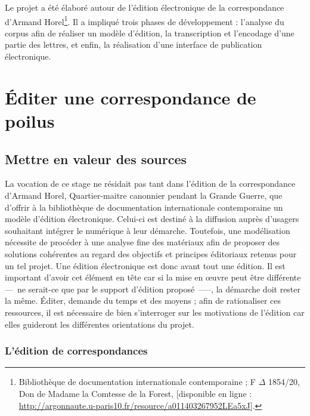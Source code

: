 \documentclass[12pt,a4paper]{book} %
\begin{document}
Le projet a été élaboré autour de l'édition électronique de la correspondance d'Armand Horel\footnote{Bibliothèque de documentation internationale contemporaine ; F $\Delta$ 1854/20, Don de Madame la Comtesse de la Forest, [disponible en ligne : \url{http://argonnaute.u-paris10.fr/resource/a011403267952LEa5xJ}].}. Il a impliqué trois phases de développement : l'analyse du corpus afin de réaliser un modèle d'édition, la transcription et l'encodage d'une partie des lettres, et enfin, la réalisation d'une interface de publication électronique.



\clearpage
\thispagestyle{empty}
\cleardoublepage
\nocite{*}
\printbibliography

\mainmatter


\part{Éditer une correspondance de poilus}


\chapter{Mettre en valeur des sources}
La vocation de ce stage ne résidait pas tant dans l'édition de la correspondance d'Armand Horel, Quartier-maitre canonnier pendant la Grande Guerre, que d'offrir à la bibliothèque de documentation internationale contemporaine un modèle d'édition électronique. Celui-ci est destiné à la diffusion auprès d'usagers souhaitant intégrer le numérique à leur démarche. 
Toutefois, une modélisation nécessite de procéder à une analyse fine des matériaux afin de proposer des solutions cohérentes au regard des objectifs et principes éditoriaux retenus pour un tel projet. Une édition électronique est donc avant tout une édition. Il est important d'avoir cet élément en tête car si la mise en œuvre peut être différente ---~ne serait-ce que par le support d'édition proposé~—--, la démarche doit rester la même. Éditer, demande du temps et des moyens ; afin de rationaliser ces ressources, il est nécessaire de bien s'interroger sur les motivations de l'édition car elles guideront les différentes orientations du projet.

\section{L'édition de correspondances}
\end{document}
